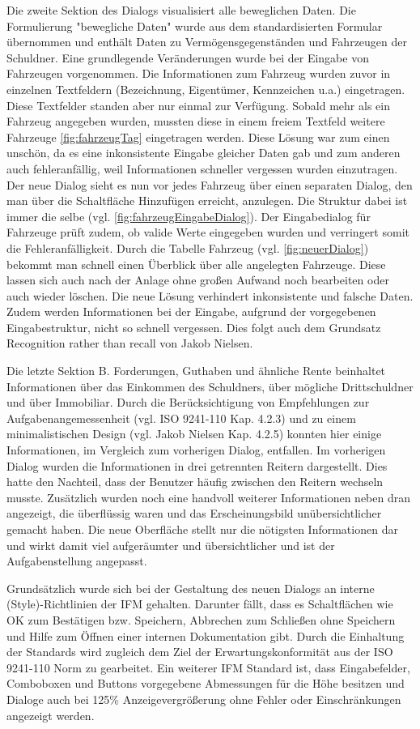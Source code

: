 Die zweite Sektion des Dialogs visualisiert alle beweglichen Daten. Die Formulierung "bewegliche Daten" wurde aus dem standardisierten Formular übernommen und enthält Daten zu Vermögensgegenständen und Fahrzeugen der Schuldner. Eine grundlegende Veränderungen wurde bei der Eingabe von Fahrzeugen vorgenommen. Die Informationen zum Fahrzeug wurden zuvor in einzelnen Textfeldern (Bezeichnung, Eigentümer, Kennzeichen u.a.) eingetragen. Diese Textfelder standen aber nur einmal zur Verfügung. Sobald mehr als ein Fahrzeug angegeben wurden, mussten diese in einem freiem Textfeld \glqq weitere Fahrzeuge \glqq \ref{fig:fahrzeugTag} eingetragen werden. Diese Lösung war zum einen unschön, da es eine inkonsistente Eingabe gleicher Daten gab und zum anderen auch fehleranfällig, weil Informationen schneller vergessen wurden einzutragen. Der neue Dialog sieht es nun vor jedes Fahrzeug über einen separaten Dialog, den man über die Schaltfläche \glqq Hinzufügen \grqq{} erreicht, anzulegen. Die Struktur dabei ist immer die selbe (vgl. \ref{fig:fahrzeugEingabeDialog}). Der Eingabedialog für Fahrzeuge prüft zudem, ob valide Werte eingegeben wurden und verringert somit die Fehleranfälligkeit. Durch die Tabelle \glqq Fahrzeug \grqq{} (vgl. \ref{fig:neuerDialog}) bekommt man schnell einen Überblick über alle angelegten Fahrzeuge. Diese lassen sich auch nach der Anlage ohne großen Aufwand noch bearbeiten oder auch wieder löschen. Die neue Lösung verhindert inkonsistente und falsche Daten. Zudem werden Informationen bei der Eingabe, aufgrund der vorgegebenen Eingabestruktur, nicht so schnell vergessen. Dies folgt auch dem Grundsatz \glqq Recognition rather than recall \grqq{} von Jakob Nielsen.

Die letzte Sektion \glqq B. Forderungen, Guthaben und ähnliche Rente \grqq{} beinhaltet Informationen über das Einkommen des Schuldners, über mögliche Drittschuldner und über Immobiliar. Durch die Berücksichtigung von Empfehlungen zur Aufgabenangemessenheit (vgl. ISO 9241-110 Kap. 4.2.3) und zu einem minimalistischen Design (vgl. Jakob Nielsen Kap. 4.2.5) konnten hier einige Informationen, im Vergleich zum vorherigen Dialog, entfallen. Im vorherigen Dialog wurden die Informationen in drei getrennten Reitern dargestellt. Dies hatte den Nachteil, dass der Benutzer häufig zwischen den Reitern wechseln musste. Zusätzlich wurden noch eine handvoll weiterer Informationen neben dran angezeigt, die überflüssig waren und das Erscheinungsbild unübersichtlicher gemacht haben. Die neue Oberfläche stellt nur die nötigsten Informationen dar und wirkt damit viel aufgeräumter und übersichtlicher und ist der Aufgabenstellung angepasst.

Grundsätzlich wurde sich bei der Gestaltung des neuen Dialogs an interne (Style)-Richtlinien der IFM gehalten. Darunter fällt, dass es Schaltflächen wie \glqq OK \grqq{} zum Bestätigen bzw. Speichern, \glqq Abbrechen \grqq{} zum Schließen ohne Speichern und \glqq Hilfe \grqq{} zum Öffnen einer internen Dokumentation gibt. Durch die Einhaltung der Standards wird zugleich dem Ziel der Erwartungskonformität aus der ISO 9241-110 Norm  zu gearbeitet. Ein weiterer IFM Standard ist, dass Eingabefelder, Comboboxen und Buttons vorgegebene Abmessungen für die Höhe besitzen und Dialoge auch bei 125\% Anzeigevergrößerung ohne Fehler oder Einschränkungen angezeigt werden.
